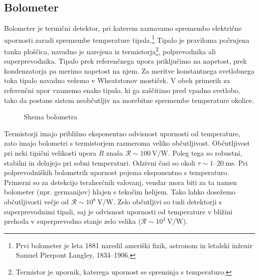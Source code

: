 \subsection*{Bolometer}
Bolometer je termični detektor, pri katerem zaznavamo spremembo 
električne upornosti
zaradi spremembe temperature tipala.\footnote{Prvi bolometer je leta 1881 naredil
ameriški fizik, astronom in letalski inženir Samuel Pierpont Langley, 1834--1906.}
Tipalo je praviloma počrnjena tanka ploščica, 
navadno je narejena iz termistorja\footnote{Termistor je upornik, katerega
upornost se spreminja s temperaturo.}, 
polprevodnika ali superprevodnika. Tipalo prek
referenčnega upora priključimo na napetost, prek kondenzatorja pa merimo napetost na njem.
Za meritve konstantnega svetlobnega toka tipalo navadno vežemo v Wheatstonov mostiček. V obeh
primerih za referenčni upor vzamemo enako tipalo, ki ga zaščitimo pred vpadno svetlobo, 
tako da postane sistem neobčutljiv na morebitne spremembe temperature okolice.
\begin{figure}[h!]
\centering
\def\svgwidth{75truemm} 

\caption{Shema bolometra}
\label{fig:Bolometer-shema}
\end{figure}

Termistorji imajo približno eksponentno odvisnost upornosti od temperature, zato imajo bolometri
s termistorjem razmeroma veliko občutljivost. Občutljivost pri neki tipični
velikosti upora $R$ znaša $\mathcal{R}\sim 100~\si{\volt/\watt}$. Poleg tega so 
robustni, stabilni in delujejo pri sobni temperaturi. Odzivni časi so okoli 
$\tau \sim 1$--$20~\si{\milli\second}$. 
Pri polprevodniških bolometrih upornost pojema eksponentno s temperaturo. 
Primerni so za detekcijo teraherčnih valovanj, 
vendar mora biti za ta namen bolometer (npr. germanijev) hlajen s tekočim helijem. 
Tako lahko dosežemo občutljivosti večje od $\mathcal{R} \sim 10^8~\si{\volt/\watt}$. Zelo 
občutljivi so tudi detektorji s superprevodnimi tipali, saj je odvisnost upornosti 
od temperature v bližini prehoda v superprevodno stanje zelo velika 
($\mathcal{R} \sim 10^3~\si{\volt/\watt}$).

